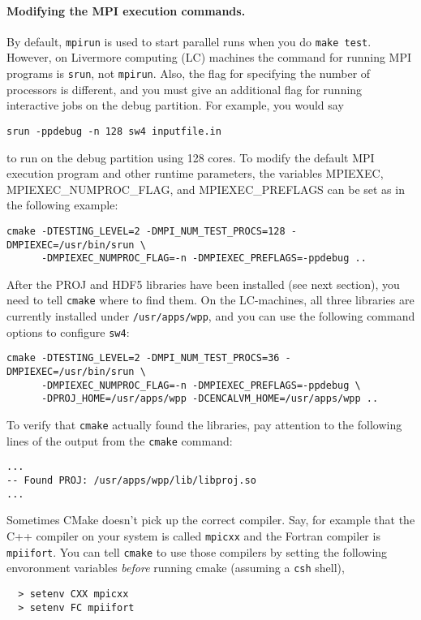 \documentclass[11pt]{article}
\begin{document}
\paragraph{Modifying the MPI execution commands.}
By default, \verb+mpirun+ is used to start parallel runs when you do \verb+make test+.  However, on
Livermore computing (LC) machines the command for running MPI programs is \verb+srun+, not
\verb+mpirun+. Also, the flag for specifying the number of processors is different, and you must
give an additional flag for running interactive jobs on the debug partition. For example, you would
say
\begin{verbatim}
srun -ppdebug -n 128 sw4 inputfile.in
\end{verbatim}
to run on the debug partition using 128 cores. To modify the default MPI execution program and
other runtime parameters, the variables MPIEXEC, MPIEXEC\_NUMPROC\_FLAG, and
MPIEXEC\_PREFLAGS can be set as in the following example:
\begin{verbatim}
cmake -DTESTING_LEVEL=2 -DMPI_NUM_TEST_PROCS=128 -DMPIEXEC=/usr/bin/srun \
      -DMPIEXEC_NUMPROC_FLAG=-n -DMPIEXEC_PREFLAGS=-ppdebug ..
\end{verbatim}

After the PROJ and HDF5 libraries have been installed (see next section), you need to tell
\verb+cmake+ where to find them. On the LC-machines, all three libraries are currently installed under
\verb+/usr/apps/wpp+, and you can use the following command options to configure \verb+sw4+:
\begin{verbatim}
cmake -DTESTING_LEVEL=2 -DMPI_NUM_TEST_PROCS=36 -DMPIEXEC=/usr/bin/srun \
      -DMPIEXEC_NUMPROC_FLAG=-n -DMPIEXEC_PREFLAGS=-ppdebug \
      -DPROJ_HOME=/usr/apps/wpp -DCENCALVM_HOME=/usr/apps/wpp ..
\end{verbatim}
To verify that \verb+cmake+ actually found the libraries, pay attention to the
following lines of the output from the \verb+cmake+ command:
\begin{verbatim}
...
-- Found PROJ: /usr/apps/wpp/lib/libproj.so  
...
\end{verbatim}

Sometimes CMake doesn't pick up the correct compiler. Say, for example that the C++ compiler on your
system is called {\tt mpicxx} and the Fortran compiler is {\tt mpiifort}. You can tell {\tt cmake}
to use those compilers by setting the following envoronment variables {\em before} running cmake
(assuming a {\tt csh} shell),
\begin{verbatim}
  > setenv CXX mpicxx
  > setenv FC mpiifort
\end{verbatim}
\end{document}
